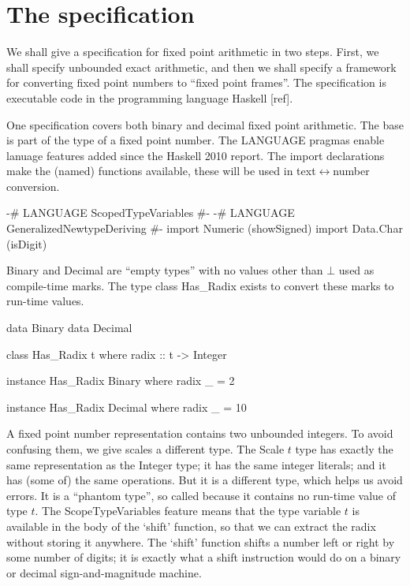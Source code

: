 \documentclass{article}
\begin{document}
\section{The specification}

We shall give a specification for fixed point arithmetic in two
steps.  First, we shall specify unbounded exact arithmetic, and
then we shall specify a framework for converting fixed point
numbers to ``fixed point frames''.  The specification is executable
code in the programming language Haskell [ref].

One specification covers both binary and decimal fixed point
arithmetic.  The base is part of the type of a fixed point number.
The LANGUAGE pragmas enable lanuage features added since the
Haskell 2010 report.  The import declarations make the (named)
functions available, these will be used in text$\leftrightarrow$number
conversion.
\begin{code}
{-# LANGUAGE ScopedTypeVariables #-}
{-# LANGUAGE GeneralizedNewtypeDeriving #-}
import Numeric (showSigned)
import Data.Char (isDigit)
\end{code}
Binary and Decimal are ``empty types'' with no values other
than $\bot$ used as compile-time marks.  The type class
Has\_Radix exists to convert these marks to run-time values.
\begin{code}
data Binary
data Decimal

class Has_Radix t
  where radix :: t -> Integer

instance Has_Radix Binary
  where radix _ = 2

instance Has_Radix Decimal
  where radix _ = 10
\end{code}

A fixed point number representation contains two unbounded integers.
To avoid confusing them, we give scales a different type.  The
Scale $t$ type has exactly the same representation as the Integer type;
it has the same integer literals; and it has (some of) the same
operations.  But it is a different type, which helps us avoid errors.
It is a ``phantom type'', so called because it
contains no run-time value of type $t$.  The ScopeTypeVariables
feature means that the type variable $t$ is available in the body
of the `shift' function, so that we can extract the radix without
storing it anywhere.  The `shift' function shifts a number left or
right by some number of digits; it is exactly what a shift instruction
would do on a binary or decimal sign-and-magnitude machine.
\end{document}
